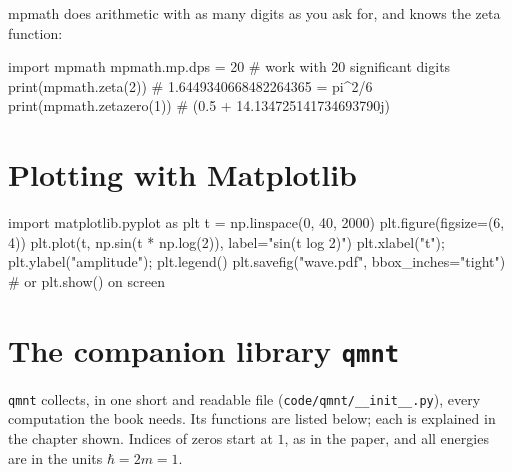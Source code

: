 mpmath does arithmetic with as many digits as you ask for, and knows the zeta function:
\begin{pycode}
import mpmath
mpmath.mp.dps = 20                 # work with 20 significant digits
print(mpmath.zeta(2))              # 1.6449340668482264365 = pi^2/6
print(mpmath.zetazero(1))          # (0.5 + 14.134725141734693790j)
\end{pycode}

\section{Plotting with Matplotlib}

\begin{pycode}
import matplotlib.pyplot as plt
t = np.linspace(0, 40, 2000)
plt.figure(figsize=(6, 4))
plt.plot(t, np.sin(t * np.log(2)), label="sin(t log 2)")
plt.xlabel("t"); plt.ylabel("amplitude"); plt.legend()
plt.savefig("wave.pdf", bbox_inches="tight")   # or plt.show() on screen
\end{pycode}

\section{The companion library \texttt{qmnt}}

\texttt{qmnt} collects, in one short and readable file (\texttt{code/qmnt/\_\_init\_\_.py}), every computation the book needs. Its functions are listed below; each is explained in the chapter shown. Indices of zeros start at $1$, as in the paper, and all energies are in the units $\hbar=2m=1$.

